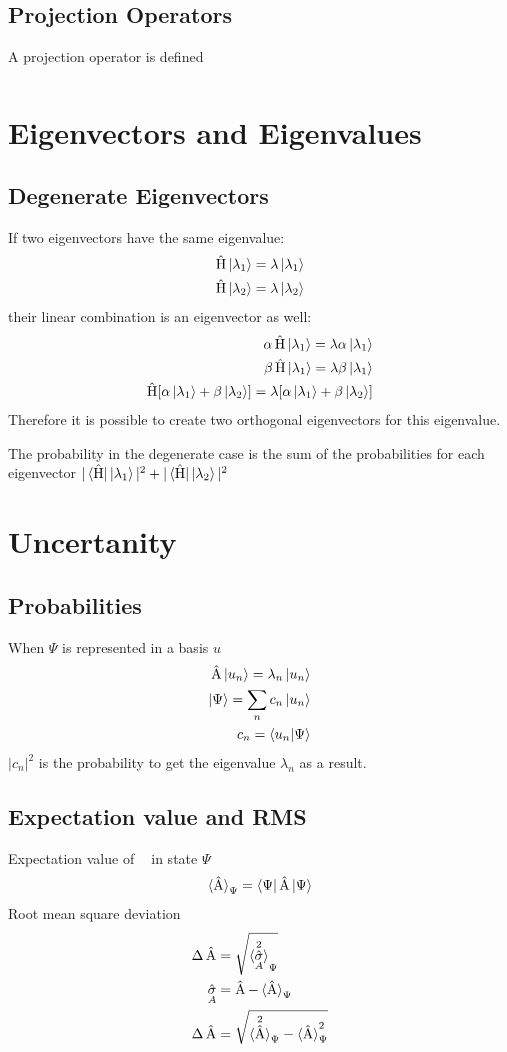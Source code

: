 \documentclass[10pt,a4paper]{book}
\DeclareMathOperator {\opH} {\hat{H}}
\DeclareMathOperator {\opA} {\hat{A}}
\DeclareMathOperator {\opSigma} {\hat{\sigma}}
\begin{document}
\section{Projection Operators}
A projection operator is defined
\begin{align}
\end{align}
\chapter{Eigenvectors and Eigenvalues}
\section{Degenerate Eigenvectors}
If two eigenvectors have the same eigenvalue:
\begin{align}
	\opH\ket{\lambda_1} = \lambda \ket{\lambda_1} \\
	\opH\ket{\lambda_2} = \lambda \ket{\lambda_2}
\end{align}
their linear combination is an eigenvector as well:
\begin{align}
	\alpha \opH\ket{\lambda_1} = \lambda \alpha \ket{\lambda_1} \\
	\beta \opH\ket{\lambda_1} = \lambda \beta \ket{\lambda_1}   \\
	\opH[\alpha \ket{\lambda_1} + \beta \ket{\lambda_2}] = \lambda [\alpha \ket{\lambda_1} + \beta \ket{\lambda_2}]
\end{align}
Therefore it is possible to create two orthogonal eigenvectors for this eigenvalue.

The probability in the degenerate case is the sum of the probabilities for each eigenvector $| \bra{\opH} \ket{\lambda_1}|^2 + | \bra{\opH} \ket{\lambda_2}|^2$

\chapter{Uncertanity}
\section{Probabilities}
When $\Psi$ is represented in a basis $u$
\begin{align}
	\opA\ket{u_n} = \lambda_n\ket{u_n}\\
	\ket{\Psi} = \sum_{n}c_n\ket{u_n} \\
	c_n = \braket{u_n|\Psi}
\end{align}
$|c_n|^2$ is the probability to get the eigenvalue $\lambda_n$ as a result.
\section{Expectation value and RMS}
Expectation value of $\opA$ in state $\Psi$
\begin{align}
	\braket{\opA}_\Psi = \bra{\Psi}\opA\ket{\Psi}
\end{align}
Root mean square deviation
\begin{align}
	\Delta \opA &= \sqrt{\braket{\opSigma_A^2}_\Psi}\\
	\opSigma_A &= \opA - \braket{\opA}_\Psi \\
	\Delta \opA &= \sqrt{\braket{\opA^2}_\Psi - \braket{\opA}_\Psi^2}
\end{align}
\end{document}
